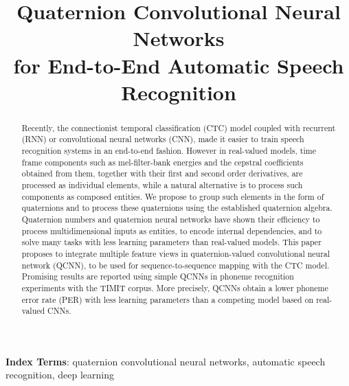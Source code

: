 \documentclass[a4paper]{article}
\title{Quaternion Convolutional Neural Networks \\for End-to-End Automatic Speech Recognition}
\begin{document}
\maketitle



\begin{abstract}
Recently, the connectionist temporal classification (CTC) model coupled with recurrent (RNN) or convolutional neural networks (CNN), made it easier to train speech recognition systems in an end-to-end fashion. However in real-valued models, time frame components such as mel-filter-bank energies and the cepstral coefficients obtained from them, together with their  first and second order derivatives, are processed as individual elements, while a natural alternative is to process such components as composed entities. We propose to group such elements in the form of quaternions and to process these quaternions using the established quaternion algebra. Quaternion numbers and quaternion neural networks have shown their efficiency to process multidimensional inputs as entities, to encode internal dependencies, and to solve many tasks with less learning parameters than real-valued models. This paper proposes to integrate multiple feature views in quaternion-valued convolutional neural network (QCNN), to be used for sequence-to-sequence mapping with the CTC model. Promising results are reported using simple QCNNs in phoneme recognition experiments with the TIMIT corpus. More precisely, QCNNs obtain a lower phoneme error rate (PER) with less learning parameters than a competing model based on real-valued CNNs.
\end{abstract}
 
\noindent\textbf{Index Terms}: quaternion convolutional neural networks, automatic speech recognition, deep learning


\end{document}
